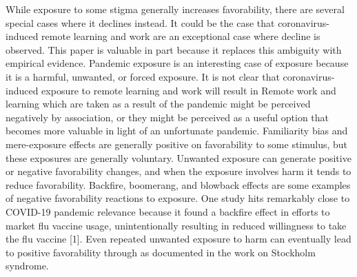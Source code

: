 \documentclass[review]{elsarticle}
\begin{document}

While exposure to some stigma generally increases favorability, there are several special cases where it declines instead.
It could be the case that coronavirus-induced remote learning and work are an exceptional case where decline is observed.
This paper is valuable in part because it replaces this ambiguity with empirical evidence.
Pandemic exposure is an interesting case of exposure because it is a harmful, unwanted, or forced exposure.
It is not clear that coronavirus-induced exposure to remote learning and work will result in
Remote work and learning which are taken as a result of the pandemic might be perceived negatively by association,
or they might be perceived as a useful option that becomes more valuable in light of an unfortunate pandemic.
Familiarity bias and mere-exposure effects are generally positive on favorability to some stimulus,
but these exposures are generally voluntary. Unwanted exposure can generate positive or negative favorability changes,
and when the exposure involves harm it tends to reduce favorability.
Backfire, boomerang, and blowback effects are some examples of negative favorability reactions to exposure.
One study hits remarkably close to COVID-19 pandemic relevance because it found a backfire effect in efforts to market flu vaccine usage,
unintentionally resulting in reduced willingness to take the flu vaccine [1].
Even repeated unwanted exposure to harm can eventually lead to positive favorability through as documented in the work on Stockholm syndrome.
\end{document}
